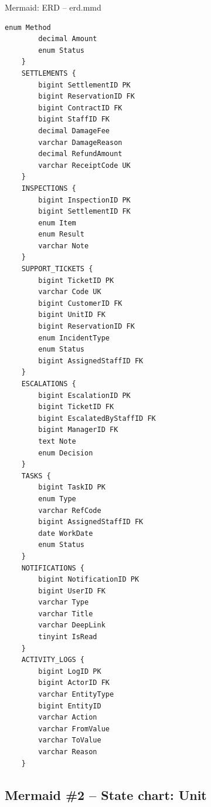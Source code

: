\documentclass[12pt,a4paper]{article}
\renewcommand{\_}{\textunderscore\allowbreak}
\begin{document}
\begin{mermaidbox}{Mermaid: ERD -- erd.mmd}
\begin{Verbatim}[fontsize=\small]
        enum Method
        decimal Amount
        enum Status
    }
    SETTLEMENTS {
        bigint SettlementID PK
        bigint ReservationID FK
        bigint ContractID FK
        bigint StaffID FK
        decimal DamageFee
        varchar DamageReason
        decimal RefundAmount
        varchar ReceiptCode UK
    }
    INSPECTIONS {
        bigint InspectionID PK
        bigint SettlementID FK
        enum Item
        enum Result
        varchar Note
    }
    SUPPORT_TICKETS {
        bigint TicketID PK
        varchar Code UK
        bigint CustomerID FK
        bigint UnitID FK
        bigint ReservationID FK
        enum IncidentType
        enum Status
        bigint AssignedStaffID FK
    }
    ESCALATIONS {
        bigint EscalationID PK
        bigint TicketID FK
        bigint EscalatedByStaffID FK
        bigint ManagerID FK
        text Note
        enum Decision
    }
    TASKS {
        bigint TaskID PK
        enum Type
        varchar RefCode
        bigint AssignedStaffID FK
        date WorkDate
        enum Status
    }
    NOTIFICATIONS {
        bigint NotificationID PK
        bigint UserID FK
        varchar Type
        varchar Title
        varchar DeepLink
        tinyint IsRead
    }
    ACTIVITY_LOGS {
        bigint LogID PK
        bigint ActorID FK
        varchar EntityType
        bigint EntityID
        varchar Action
        varchar FromValue
        varchar ToValue
        varchar Reason
    }
\end{Verbatim}
\end{mermaidbox}

\subsection{Mermaid \#2 -- State chart: Unit}
\end{document}
